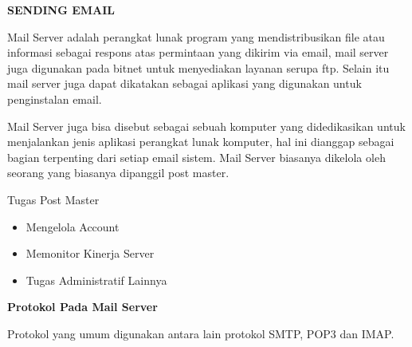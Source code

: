 \documentclass[a4paper,12pt]{report}
\begin{document}
\sloppy
\begin{center}{\fontsize{14pt}{14pt}\selectfont \textbf{SENDING EMAIL} \\}\end{center} \par
Mail Server adalah perangkat lunak program yang mendistribusikan file atau informasi sebagai respons atas permintaan yang dikirim via email, mail server juga digunakan pada bitnet untuk menyediakan layanan serupa ftp. Selain itu mail server juga dapat dikatakan sebagai aplikasi yang digunakan untuk penginstalan email.  \par
\vspace{12pt}
Mail Server juga bisa disebut sebagai sebuah komputer yang didedikasikan untuk menjalankan jenis aplikasi perangkat lunak komputer, hal ini dianggap sebagai bagian terpenting dari setiap email sistem. Mail Server biasanya dikelola oleh seorang yang biasanya dipanggil post master. \par
\vspace{12pt}
\noindent 
Tugas Post Master  \par
\noindent 
\begin{itemize}
\item Mengelola Account \par
\noindent 
\item Memonitor Kinerja Server \par
\noindent 
\item Tugas Administratif Lainnya\end{itemize}
 \par
\vspace{12pt}
\vspace{12pt}
\noindent 
\textbf{Protokol Pada Mail Server} \par
\noindent 
Protokol yang umum digunakan antara lain protokol SMTP, POP3 dan IMAP. \par
\noindent 
\end{document}

